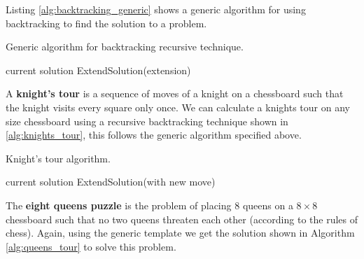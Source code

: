 Listing \ref{alg:backtracking_generic} shows a generic algorithm for using backtracking to find the solution to a problem.

\begin{algorithm}
    \caption{Generic algorithm for backtracking recursive technique.}
    \label{alg:backtracking_generic}
    \begin{algorithmic}
                    \State \Return current solution
                \Else
                        ExtendSolution(extension)
                    \EndFor
                \EndIf
            \EndIf
        \EndProcedure
    \end{algorithmic}
\end{algorithm}

\begin{example}
    A \textbf{knight's tour} is a sequence of moves of a knight on a chessboard such that the knight visits every square only once. We can calculate a knights tour on any size chessboard using a recursive backtracking technique shown in \ref{alg:knights_tour}, this follows the generic algorithm specified above.
\end{example}

\begin{algorithm}
    \caption{Knight's tour algorithm.}
    \label{alg:knights_tour}
    \begin{algorithmic}[H]
                    \State \Return current solution
                \Else
                        \State ExtendSolution(with new move)
                    \EndFor
                \EndIf
            \EndIf
        \EndProcedure
    \end{algorithmic}
\end{algorithm}

\begin{example}
    The \textbf{eight queens puzzle} is the problem of placing $8$ queens on a $8\times 8$ chessboard such that no two queens threaten each other (according to the rules of chess). Again, using the generic template we get the solution shown in Algorithm \ref{alg:queens_tour} to solve this problem.
\end{example}

